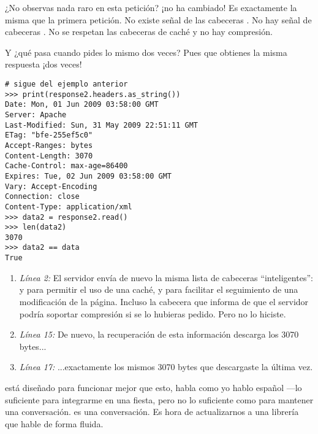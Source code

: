 ¿No observas nada raro en esta petición? ¡no ha cambiado! Es exactamente la misma que la primera petición. No existe señal de las cabeceras . No hay señal de cabeceras . No se respetan las cabeceras de caché y no hay compresión.

Y ¿qué pasa cuando pides lo mismo dos veces? Pues que obtienes la misma respuesta ¡dos veces!

\noindent\begin{minipage}{\textwidth}
\begin{lstlisting}[mathescape=True]
# sigue del ejemplo anterior
>>> print(response2.headers.as_string())
Date: Mon, 01 Jun 2009 03:58:00 GMT
Server: Apache
Last-Modified: Sun, 31 May 2009 22:51:11 GMT
ETag: "bfe-255ef5c0"
Accept-Ranges: bytes
Content-Length: 3070
Cache-Control: max-age=86400
Expires: Tue, 02 Jun 2009 03:58:00 GMT
Vary: Accept-Encoding
Connection: close
Content-Type: application/xml
>>> data2 = response2.read()
>>> len(data2)
3070
>>> data2 == data
True
\end{lstlisting}
\end{minipage}

\begin{enumerate}

\item \emph{Línea 2:} El servidor envía de nuevo la misma lista de cabeceras ``inteligentes'':  y  para permitir el uso de una caché,  y  para facilitar el seguimiento de una modificación de la página. Incluso la cabecera  que informa de que el servidor podría soportar compresión si se lo hubieras pedido. Pero no lo hiciste.

\item \emph{Línea 15:} De nuevo, la recuperación de esta información descarga los 3070 bytes...

\item \emph{Línea 17:} ...exactamente los mismos 3070 bytes que descargaste la última vez.

\end{enumerate}

 está diseñado para funcionar mejor que esto,  habla  como yo hablo español ---lo suficiente para integrarme en una fiesta, pero no lo suficiente como para mantener una conversación.  es una conversación. Es hora de actualizarnos a una librería que hable  de forma fluida.

